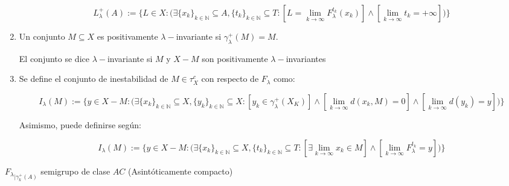 \begin{defn}
\begin{enumerate}
		\begin{equation*}
			L_\lambda^+(A) := \{L \in X :\bigg(\exists \{x_k\}_{k \in \mathbb{N}} \subseteq A,\{t_k\}_{k \in \mathbb{N}} \subseteq T: [L = \lim_{k\to \infty} F_\lambda^{t_k}(x_k)] \land [\lim_{k \to \infty} t_k= +\infty]\bigg)\}
		\end{equation*}
		
		\item Un conjunto $M\subseteq X$ es positivamente $\lambda-$invariante si $\gamma^+_\lambda(M) = M$. 
		
		El conjunto se dice $\lambda-$invariante si $M$ y $X-M$ son positivamente $\lambda-$invariantes
		
		\item Se define el conjunto de inestabilidad de $M \in \tau_X^c$ con respecto de $F_\lambda$ como:
		
		\begin{equation*}
			I_\lambda(M) := \{y \in X-M :\bigg(\exists \{x_k\}_{k \in \mathbb{N}} \subseteq X,\{y_k\}_{k \in \mathbb{N}} \subseteq X : [y_k \in \gamma^+_\lambda(X_K)] \land [\lim_{k \to \infty}d(x_k,M)= 0]\land [\lim_{k \to \infty}d(y_k)= y]\bigg)   \}
		\end{equation*}
		
		Asimismo, puede definirse según:
		
		\begin{equation*}
			I_\lambda(M) := \{y \in X-M :\bigg(\exists \{x_k\}_{k \in \mathbb{N}} \subseteq X,\{t_k\}_{k \in \mathbb{N}} \subseteq T :  [\exists \lim_{k \to \infty}x_k\in M]\land [\lim_{k \to \infty}F^{t_k}_\lambda = y]\bigg)   \}
		\end{equation*}
	\end{enumerate}
\end{defn}

\begin{prop}
	${F_{\lambda}}_{|\gamma_k^+(A)}$ semigrupo de clase $AC$ (Asintóticamente compacto)
\end{prop}


